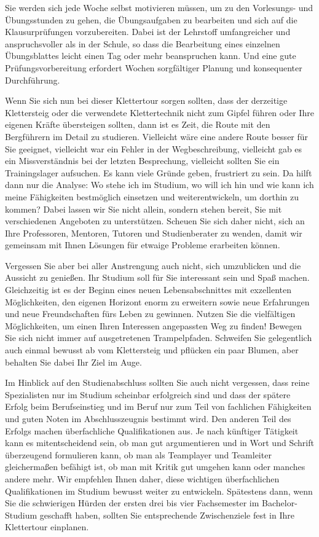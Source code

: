 {    Sie werden sich jede Woche selbst motivieren müssen, um zu den Vorlesungs- und Übungsstunden zu gehen, die Übungsaufgaben zu bearbeiten und sich auf die Klausurprüfungen vorzubereiten. Dabei ist der Lehrstoff umfangreicher und anspruchsvoller als in der Schule, so dass die Bearbeitung eines einzelnen Übungsblattes leicht einen Tag oder mehr beanspruchen kann. Und eine gute Prüfungsvorbereitung erfordert Wochen sorgfältiger Planung und konsequenter Durchführung.

    Wenn Sie sich nun bei dieser Klettertour sorgen sollten, dass der derzeitige Klettersteig oder die verwendete Klettertechnik nicht zum Gipfel führen oder Ihre eigenen Kräfte übersteigen sollten, dann ist es Zeit, die Route mit den Bergführern im Detail zu studieren. Vielleicht wäre eine andere Route besser für Sie geeignet, vielleicht war ein Fehler in der Wegbeschreibung, vielleicht gab es ein Missverständnis bei der letzten Besprechung, vielleicht sollten Sie ein Trainingslager aufsuchen. Es kann viele Gründe geben, frustriert zu sein. Da hilft dann nur die Analyse: Wo stehe ich im Studium, wo will ich hin und wie kann ich meine Fähigkeiten bestmöglich einsetzen und weiterentwickeln, um dorthin zu kommen? Dabei lassen wir Sie nicht allein, sondern stehen bereit, Sie mit verschiedenen Angeboten zu unterstützen. Scheuen Sie sich daher nicht, sich an Ihre Professoren, Mentoren, Tutoren und Studienberater zu wenden, damit wir gemeinsam mit Ihnen Lösungen für etwaige Probleme erarbeiten können.


    Vergessen Sie aber bei aller Anstrengung auch nicht, sich umzublicken und die Aussicht zu genießen. Ihr Studium soll für Sie interessant sein und Spaß machen. Gleichzeitig ist es der Beginn eines neuen Lebensabschnittes mit exzellenten Möglichkeiten, den eigenen Horizont enorm zu erweitern sowie neue Erfahrungen und neue Freundschaften fürs Leben zu gewinnen. Nutzen Sie die vielfältigen Möglichkeiten, um einen Ihren Interessen angepassten Weg zu finden! Bewegen Sie sich nicht immer auf ausgetretenen Trampelpfaden. Schweifen Sie gelegentlich auch einmal bewusst ab vom Klettersteig und pflücken ein paar Blumen, aber behalten Sie dabei Ihr Ziel im Auge.

    Im Hinblick auf den Studienabschluss sollten Sie auch nicht vergessen, dass reine Spezialisten nur im Studium scheinbar erfolgreich sind und dass der spätere Erfolg beim Berufseinstieg und im Beruf nur zum Teil
    von fachlichen Fähigkeiten und guten Noten im Abschlusszeugnis bestimmt wird. Den anderen Teil des Erfolgs machen überfachliche Qualifikationen aus. Je nach künftiger Tätigkeit kann es mitentscheidend sein, ob man gut argumentieren und in Wort und Schrift überzeugend formulieren kann, ob man als Teamplayer und Teamleiter gleichermaßen befähigt ist, ob man mit Kritik gut umgehen kann oder manches andere mehr. Wir empfehlen Ihnen daher, diese wichtigen überfachlichen Qualifikationen im Studium bewusst weiter zu entwickeln. Spätestens dann, wenn Sie die schwierigen Hürden der ersten drei bis vier Fachsemester im Bachelor-Studium geschafft haben, sollten Sie entsprechende Zwischenziele fest in Ihre Klettertour einplanen.

}
